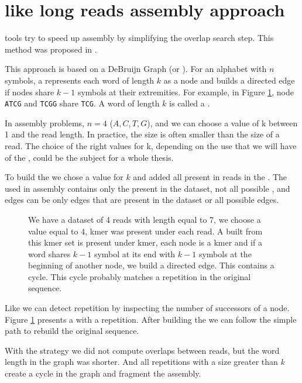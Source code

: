 \documentclass[main]{subfiles}
\begin{document}
\section{\DBG like long reads assembly approach} \label{section:sota:wtdbg}

\DBG tools try to speed up assembly by simplifying the overlap search step. This method was proposed in  \cite{eulerian_approach}.

This approach is based on a DeBruijn Graph (or \DBG). For an alphabet with $n$ symbols, a \DBG represents each word of length $k$ as a node and builds a directed edge if nodes share $k - 1$ symbols at their extremities. For example, in Figure \ref{intro:fig:dbg:graph}, node \texttt{ATCG} and \texttt{TCGG} share \texttt{TCG}. A word of length $k$ is called a \kmer.

In assembly problems, $n = 4$ (${A, C, T, G}$), and we can choose a value of k between 1 and the read length. In practice, the size is often smaller than the size of a read. The choice of the right values for k, depending on the use that we will have of the \DBG, could be the subject for a whole thesis.

To build the \DBG we chose a value for $k$ and added all \kmer present in reads in the \DBG. The \DBG used in assembly contains only the \kmer present in the dataset, not all possible \kmer, and edges can be only edges that are present in the dataset or all possible edges.

\begin{figure}[ht]
    \center
    
    \caption{We have a dataset of 4 reads with length equal to 7, we choose a value equal to 4, kmer was present under each read. A \DBG built from this kmer set is present under kmer, each node is a kmer and if a word shares $k - 1$ symbol at its end with $k - 1$ symbols at the beginning of another node, we build a directed edge. This \DBG contains a cycle. This cycle probably matches a repetition in the original sequence.}
    \label{intro:fig:dbg:graph}
\end{figure}

Like \OLC we can detect repetition by inspecting the number of successors of a node. Figure \ref{intro:fig:dbg:graph} presents a \DBG with a repetition. After building the \DBG we can follow the simple path to rebuild the original sequence.

With the \DBG strategy we did not compute overlaps between reads, but the word length in the graph was shorter. And all repetitions with a size greater than $k$ create a cycle in the graph and fragment the assembly.
\end{document}
